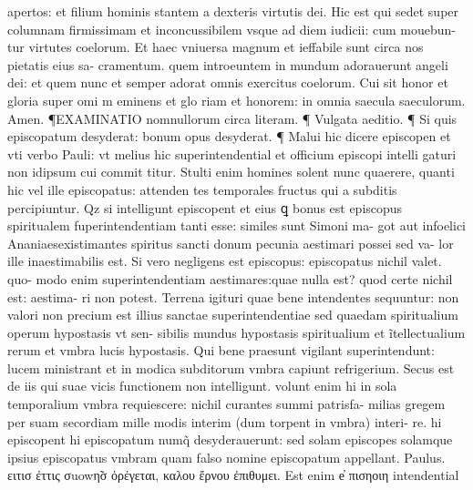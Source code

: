 \documentclass{article}
\begin{document}
\begin{pages}
apertos: et filium hominis stantem a dexteris virtutis dei. Hic est qui sedet super columnam firmissimam et inconcussibilem vsque ad diem iudicii: cum mouebun- tur virtutes coelorum. Et haec vniuersa magnum et ieffabile sunt circa nos pietatis eius sa- cramentum. quem introeuntem in mundum adorauerunt angeli dei: et quem nunc et semper adorat omnis exercitus coelorum. Cui sit honor et gloria super omi m eminens et glo riam et honorem: in omnia saecula saeculorum. Amen.  \pend\pstart ¶EXAMINATIO nomnullorum circa literam. ¶ Vulgata aeditio. ¶ Si quis episcopatum desyderat: bonum opus desyderat. ¶ Malui hic dicere episcopen et vti verbo Pauli: vt melius hic superintendential et officium episcopi intelli gaturi non idipsum cui commit titur. Stulti enim homines solent nunc quaerere, quanti hic vel ille episcopatus: attenden tes temporales fructus qui a subditis percipiuntur. Qz si intelligunt episcopent et eius ꝗ bonus est episcopus spiritualem fuperintendentiam tanti esse: similes sunt Simoni ma- got aut infoelici Ananiaesexistimantes spiritus sancti donum pecunia aestimari possei sed va- lor ille inaestimabilis est. Si vero negligens est episcopus: episcopatus nichil valet. quo- modo enim superintendentiam aestimares:quae nulla est? quod certe nichil est: aestima- ri non potest. Terrena igituri quae bene intendentes sequuntur: non valori non precium est illius sanctae superintendentiae sed quaedam spiritualium operum hypostasis vt sen- sibilis mundus hypostasis spiritualium et ĩtellectualium rerum et vmbra lucis hypostasis. Qui bene praesunt vigilant superintendunt: lucem ministrant et in modica subditorum vmbra capiunt refrigerium. Secus est de iis qui suae vicis functionem non intelligunt. volunt enim hi in sola temporalium vmbra requiescere: nichil curantes summi patrisfa- milias gregem per suam secordiam mille modis interim (dum torpent in vmbra) interi- re. hi episcopent hi episcopatum numq̃ desyderauerunt: sed solam episcopes solamque ipsius episcopatus vmbram quam falso nomine episcopatum appellant. Paulus. ειτισ ἐττις σuowη̃σ ὀρέγεται, καλου ἔρνου ἐπιθυμει. Est enim e̓ πισηοιη intendential  \pend

\end{pages}
\end{document}
